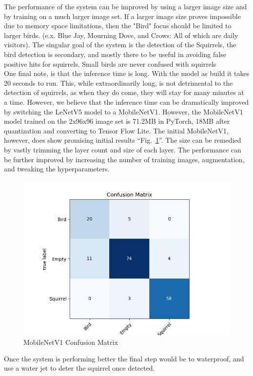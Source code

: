 \documentclass[conference]{IEEEtran}
\begin{document}
The performance of the system can be improved by using a larger image size and by training on a much larger image set. If a larger image size proves impossible due to memory space limitations, then the "Bird" focus should be limited to larger birds. (e.x. Blue Jay, Mourning Dove, and Crows: All of which are daily visitors). The singular goal of the system is the detection of the Squirrels, the bird detection is secondary, and mostly there to be useful in avoiding false positive hits for squirrels. Small birds are never confused with squirrels\\
One final note, is that the inference time is long. With the model as build it takes 20 seconds to run. This, while extraordinarily long, is not detrimental to the detection of squirrels, as when they do come, they will stay for many minutes at a time. However, we believe that the inference time can be dramatically improved by switching the LeNetV5 model to a MobileNetV1. However, the MobileNetV1 model trained on the 2x96x96 image set is 71.2MB in PyTorch, 18MB after quantization and converting to Tensor Flow Lite. The initial MobileNetV1, however, does show promising initial results ``Fig.~\ref{MbNetV1ConfMat}''. The size can be remedied by vastly trimming the layer count and size of each layer. The performance can be further improved by increasing the number of training images, augmentation, and tweaking the hyperparameters.\\
\begin{figure}[htbp]
\centerline{\includegraphics[scale=0.5]{MbNet_confMatrix.png}}
\caption{MobileNetV1 Confusion Matrix}
\label{MbNetV1ConfMat}
\end{figure}
Once the system is performing better the final step would be to waterproof, and use a water jet to deter the squirrel once detected.
\end{document}
